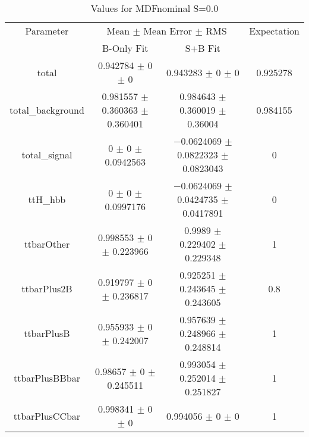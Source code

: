 \begin{table}
\centering
\caption{Values for MDFnominal S=0.0}
\begin{tabular}{cccc}
\toprule
Parameter & \multicolumn{2}{c}{Mean $\pm$ Mean Error $\pm$ RMS} & Expectation\\
 & B-Only Fit & S+B Fit & \\
\midrule
total & \num{0.942784} $\pm$ \num{0} $\pm$ \num{0} & \num{0.943283} $\pm$ \num{0} $\pm$ \num{0} & \num{0.925278}\\
total\_background & \num{0.981557} $\pm$ \num{0.360363} $\pm$ \num{0.360401} & \num{0.984643} $\pm$ \num{0.360019} $\pm$ \num{0.36004} & \num{0.984155}\\
total\_signal & \num{0} $\pm$ \num{0} $\pm$ \num{0.0942563} & \num{-0.0624069} $\pm$ \num{0.0822323} $\pm$ \num{0.0823043} & \num{0}\\
ttH\_hbb & \num{0} $\pm$ \num{0} $\pm$ \num{0.0997176} & \num{-0.0624069} $\pm$ \num{0.0424735} $\pm$ \num{0.0417891} & \num{0}\\
ttbarOther & \num{0.998553} $\pm$ \num{0} $\pm$ \num{0.223966} & \num{0.9989} $\pm$ \num{0.229402} $\pm$ \num{0.229348} & \num{1}\\
ttbarPlus2B & \num{0.919797} $\pm$ \num{0} $\pm$ \num{0.236817} & \num{0.925251} $\pm$ \num{0.243645} $\pm$ \num{0.243605} & \num{0.8}\\
ttbarPlusB & \num{0.955933} $\pm$ \num{0} $\pm$ \num{0.242007} & \num{0.957639} $\pm$ \num{0.248966} $\pm$ \num{0.248814} & \num{1}\\
ttbarPlusBBbar & \num{0.98657} $\pm$ \num{0} $\pm$ \num{0.245511} & \num{0.993054} $\pm$ \num{0.252014} $\pm$ \num{0.251827} & \num{1}\\
ttbarPlusCCbar & \num{0.998341} $\pm$ \num{0} $\pm$ \num{0} & \num{0.994056} $\pm$ \num{0} $\pm$ \num{0} & \num{1}\\
\bottomrule
\end{tabular}
\end{table}